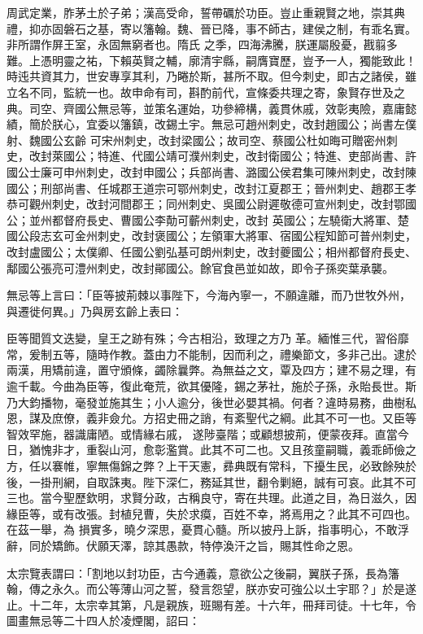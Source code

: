 \begin{pinyinscope}
 周武定業，胙茅土於子弟；漢高受命，誓帶礪於功臣。豈止重親賢之地，崇其典禮，抑亦固磐石之基，寄以籓翰。魏、晉已降，事不師古，建侯之制，有乖名實。非所謂作屏王室，永固無窮者也。隋氏
 之季，四海沸騰，朕運屬殷憂，戡翦多難。上憑明靈之祐，下賴英賢之輔，廓清宇縣，嗣膺寶歷，豈予一人，獨能致此！時迍共資其力，世安專享其利，乃睠於斯，甚所不取。但今刺史，即古之諸侯，雖立名不同，監統一也。故申命有司，斟酌前代，宣條委共理之寄，象賢存世及之典。司空、齊國公無忌等，並策名運始，功參締構，義貫休戚，效彰夷險，嘉庸懿績，簡於朕心，宜委以籓鎮，改錫土宇。無忌可趙州刺史，改封趙國公；尚書左僕射、魏國公玄齡
 可宋州刺史，改封梁國公；故司空、蔡國公杜如晦可贈密州刺史，改封萊國公；特進、代國公靖可濮州刺史，改封衛國公；特進、吏部尚書、許國公士廉可申州刺史，改封申國公；兵部尚書、潞國公侯君集可陳州刺史，改封陳國公；刑部尚書、任城郡王道宗可鄂州刺史，改封江夏郡王；晉州刺史、趙郡王孝恭可觀州刺史，改封河間郡王；同州刺史、吳國公尉遲敬德可宣州刺史，改封鄂國公；並州都督府長史、曹國公李勣可蘄州刺史，改封
 英國公；左驍衛大將軍、楚國公段志玄可金州刺史，改封褒國公；左領軍大將軍、宿國公程知節可普州刺史，改封盧國公；太僕卿、任國公劉弘基可朗州刺史，改封夔國公；相州都督府長史、鄅國公張亮可澧州刺史，改封鄖國公。餘官食邑並如故，即令子孫奕葉承襲。



 無忌等上言曰：「臣等披荊棘以事陛下，今海內寧一，不願違離，而乃世牧外州，與遷徙何異。」乃與房玄齡上表曰：



 臣等聞質文迭變，皇王之跡有殊；今古相沿，致理之方乃
 革。緬惟三代，習俗靡常，爰制五等，隨時作教。蓋由力不能制，因而利之，禮樂節文，多非己出。逮於兩漢，用矯前違，置守頒條，蠲除曩弊。為無益之文，覃及四方；建不易之理，有逾千載。今曲為臣等，復此奄荒，欲其優隆，錫之茅社，施於子孫，永貽長世。斯乃大鈞播物，毫發並施其生；小人逾分，後世必嬰其禍。何者？違時易務，曲樹私恩，謀及庶僚，義非僉允。方招史冊之誚，有紊聖代之綱。此其不可一也。又臣等智效罕施，器識庸陋。或情緣右戚，
 遂陟臺階；或顧想披荊，便蒙夜拜。直當今日，猶愧非才，重裂山河，愈彰濫賞。此其不可二也。又且孩童嗣職，義乖師儉之方，任以褰帷，寧無傷錦之弊？上干天憲，彞典既有常科，下擾生民，必致餘殃於後，一掛刑網，自取誅夷。陛下深仁，務延其世，翻令剿絕，誠有可哀。此其不可三也。當今聖歷欽明，求賢分政，古稱良守，寄在共理。此道之目，為日滋久，因緣臣等，或有改張。封植兒曹，失於求瘼，百姓不幸，將焉用之？此其不可四也。在茲一舉，為
 損實多，曉夕深思，憂貫心髓。所以披丹上訴，指事明心，不敢浮辭，同於矯飾。伏願天澤，諒其愚款，特停渙汗之旨，賜其性命之恩。



 太宗覽表謂曰：「割地以封功臣，古今通義，意欲公之後嗣，翼朕子孫，長為籓翰，傳之永久。而公等薄山河之誓，發言怨望，朕亦安可強公以土宇耶？」於是遂止。十二年，太宗幸其第，凡是親族，班賜有差。十六年，冊拜司徒。十七年，令圖畫無忌等二十四人於凌煙閣，詔曰：




\end{pinyinscope}
